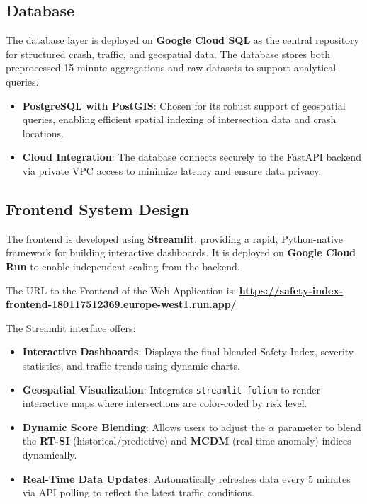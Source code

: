 \documentclass[conference]{IEEEtran}
\begin{document}
\subsection{Database}
The database layer is deployed on \textbf{Google Cloud SQL} as the central repository for structured crash, traffic, and geospatial data. The database stores both preprocessed 15-minute aggregations and raw datasets to support analytical queries.

\begin{itemize}
    \item \textbf{PostgreSQL with PostGIS}: Chosen for its robust support of geospatial queries, enabling efficient spatial indexing of intersection data and crash locations.
    \item \textbf{Cloud Integration}: The database connects securely to the FastAPI backend via private VPC access to minimize latency and ensure data privacy.
\end{itemize}

\subsection{Frontend System Design}
The frontend is developed using \textbf{Streamlit}, providing a rapid, Python-native framework for building interactive dashboards. It is deployed on \textbf{Google Cloud Run} to enable independent scaling from the backend.

The URL to the Frontend of the Web Application is:   
\textbf{\url{https://safety-index-frontend-180117512369.europe-west1.run.app/}}

\noindent The Streamlit interface offers:
\begin{itemize}
    \item \textbf{Interactive Dashboards}: Displays the final blended Safety Index, severity statistics, and traffic trends using dynamic charts.
    \item \textbf{Geospatial Visualization}: Integrates \texttt{streamlit-folium} to render interactive maps where intersections are color-coded by risk level.
    \item \textbf{Dynamic Score Blending}: Allows users to adjust the $\alpha$ parameter to blend the \textbf{RT-SI} (historical/predictive) and \textbf{MCDM} (real-time anomaly) indices dynamically.
    \item \textbf{Real-Time Data Updates}: Automatically refreshes data every 5 minutes via API polling to reflect the latest traffic conditions.
\end{itemize}
\end{document}

